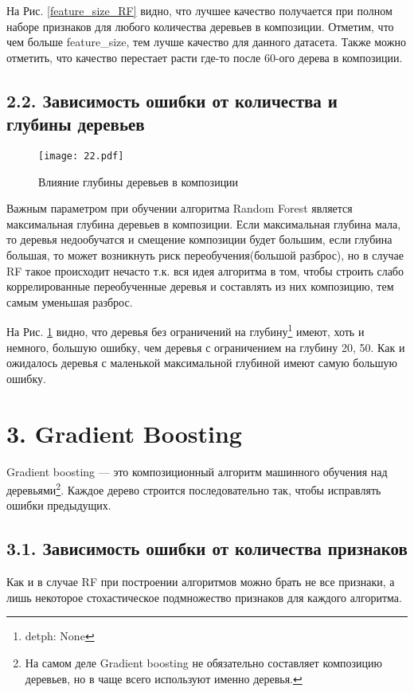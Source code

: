 \documentclass[12pt,fleqn]{article}
\begin{document}
На Рис. \ref{feature_size_RF} видно, что лучшее качество получается
при полном наборе признаков для любого количества деревьев в композиции.
Отметим, что чем больше feature\_size, тем лучше качество для данного датасета.
Также можно отметить, что качество перестает расти где-то после 60-ого 
дерева в композиции.

\subsection{2.2. Зависимость ошибки от количества и глубины деревьев}
\begin{figure}[htb]
    \centering
    \texttt{[image: 22.pdf]}
    \caption{Влияние глубины деревьев в композиции}
    \label{depth_RF}
\end{figure}

Важным параметром при обучении алгоритма Random Forest является максимальная
глубина деревьев в композиции. Если максимальная глубина мала, то деревья
недообучатся и смещение композиции будет большим, если глубина большая, то может
возникнуть риск переобучения(большой разброс), но в случае RF такое происходит нечасто
т.к. вся идея алгоритма в том, чтобы строить слабо коррелированные переобученные деревья и 
составлять из них композицию, тем самым уменьшая разброс.

На Рис. \ref{depth_RF} видно, что деревья без ограничений на глубину\footnote{detph: None}
имеют, хоть и немного, большую ошибку, чем деревья с ограничением на глубину 20, 50. Как и 
ожидалось деревья с маленькой максимальной глубиной имеют самую большую ошибку.

\section{3. Gradient Boosting}
Gradient boosting --- это композиционный алгоритм машинного обучения над деревьями\footnote{На самом деле 
Gradient boosting не обязательно составляет композицию деревьев, но в чаще всего используют именно деревья.}.
Каждое дерево строится последовательно так, чтобы исправлять ошибки предыдущих.

\subsection{3.1. Зависимость ошибки от количества признаков}

Как и в случае  RF при построении алгоритмов можно брать не все признаки, а лишь некоторое
стохастическое подмножество признаков для каждого алгоритма. 
\end{document}
